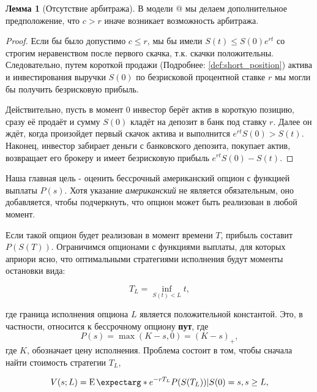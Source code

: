 \documentclass[a4paper,12pt]{article}
\makeatletter
\theoremstyle{definition}
\newtheorem{lemma}{Лемма}
\newcommand*{\rom}[1]{\expandafter\@slowromancap\romannumeral #1@}
\newcommand{\expect}{\operatorname{E}\expectarg}
\makeatother
\begin{document}
\begin{lemma}[Отсутствие арбитража]\label{thm:no_arbitrage_theoreme}
В модели \rom{2} мы делаем дополнительное предположение, что $c > r$ иначе возникает возможность арбитража. 
\end{lemma}
\begin{proof}
Если бы было допустимо $c \le r$, мы бы имели $S(t) \le S(0)e^{rt}$ со строгим неравенством после первого скачка, т.к. скачки положительны. Следовательно, путем короткой продажи (Подробнее: \ref{def:short_position}) актива и инвестирования выручки $S(0)$ по безрисковой процентной ставке $r$ мы могли бы получить безрисковую прибыль.

Действительно, пусть в момент $0$ инвестор берёт актив в короткую позицию, сразу её продаёт и сумму $S(0)$ кладёт на депозит в банк под ставку $r$. Далее он ждёт, когда произойдет первый скачок актива и выполнится $e^{rt} S(0) > S(t)$. Наконец, инвестор забирает деньги с банковского депозита, покупает актив, возвращает его брокеру и имеет безрисковую прибыль $e^{rt}S(0) - S(t)$.
\end{proof}

Наша главная цель - оценить бессрочный американский
опцион с функцией выплаты $P(s)$. Хотя указание \textit{американский} не является обязательным, оно добавляется, чтобы подчеркнуть, что опцион может быть реализован в любой момент.

Если такой опцион будет реализован в момент времени $T$, прибыль составит $P(S(T))$. Ограничимся опционами с функциями выплаты, для которых априори ясно, что оптимальными стратегиями исполнения будут моменты остановки вида:

\begin{equation}\label{eq:optimal_excersize}
T_L = \inf\limits_{S(t) < L}{t},
\end{equation}

где граница исполнения опциона $L$ является положительной константой. Это, в частности, относится к бессрочному опциону \textbf{пут}, где 
\begin{equation}\label{eq:payoff_function}
P(s) = \max(K - s, 0) = (K - s)_+,
\end{equation}
где $K$, обозначает цену исполнения. Проблема состоит в
том, чтобы сначала найти стоимость стратегии $T_L$,

\begin{equation}\label{eq:strategy_cost}
V(s; L) = \expect*{e^{-rT_L} P(S(T_L)) | S(0) = s}, s \ge L,
\end{equation}
\end{document}

